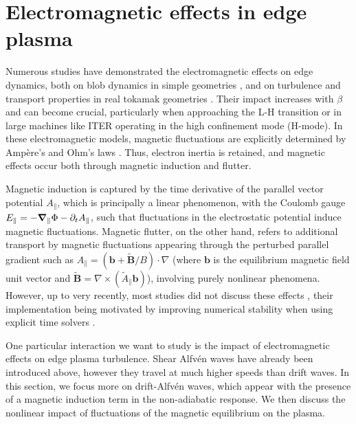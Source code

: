 \section{Electromagnetic effects in edge plasma}
\label{sec:edge_EMeffects}

Numerous studies have demonstrated the electromagnetic effects on edge dynamics, both on blob dynamics in simple geometries \cite{lee2015, Stepanenko_2020}, and on turbulence and transport properties in real tokamak geometries \cite{zhu2023, zholobenko_2024}. Their impact increases with $\beta$ and can become crucial, particularly when approaching the L-H transition or in large machines like ITER operating in the high confinement mode (H-mode)\cite{zholobenko_2024}. In these electromagnetic models, magnetic fluctuations are explicitly determined by Ampère's and Ohm’s laws \cite{DUDSON_2009, Ricci_2012, dudson2015, stegmeir2019, giacomin2022gbs, zhang2024}. Thus, electron inertia is retained, and magnetic effects occur both through magnetic induction and flutter. 

Magnetic induction is captured by the time derivative of the parallel vector potential $A_\parallel$, which is principally a linear phenomenon, with the Coulomb gauge $E_\parallel = - \grad_\parallel \Phi - \partial_t A_\parallel$, such that fluctuations in the electrostatic potential induce magnetic fluctuations. Magnetic flutter\cite{callen_1977}, on the other hand, refers to additional transport by magnetic fluctuations appearing through the perturbed parallel gradient such as $A_\parallel = (\boldsymbol{b} + \boldsymbol{\tilde{B}}/B) \cdot \nabla$ (where $\boldsymbol{b}$ is the equilibrium magnetic field unit vector and $\boldsymbol{\tilde{B}} = \nabla \times (\tilde{A}_\parallel \boldsymbol{b})$), involving purely nonlinear phenomena. However, up to very recently, most studies did not discuss these effects \cite{DUDSON_2009}, their implementation being motivated by improving numerical stability when using explicit time solvers \cite{stegmeir2019, giacomin2022gbs}. 


One particular interaction we want to study is the impact of electromagnetic effects on edge plasma turbulence. Shear Alfvén waves have already been introduced above, however they travel at much higher speeds than drift waves. In this section, we focus more on drift-Alfvén waves, which appear with the presence of a magnetic induction term in the non-adiabatic response. We then discuss the nonlinear impact of fluctuations of the magnetic equilibrium on the plasma.


